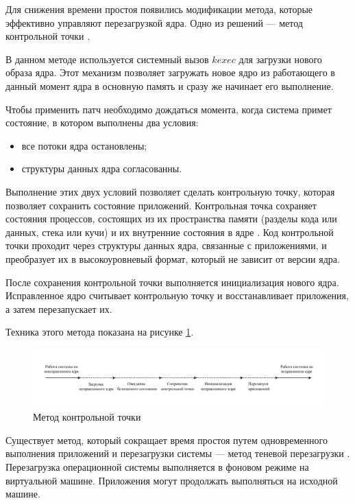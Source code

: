 Для снижения времени простоя появились модификации метода, которые эффективно управляют перезагрузкой ядра. Одно из решений --- метод контрольной точки \cite{kup}.

В данном методе используется системный вызов $kexec$  \cite{seamless} для загрузки нового образа ядра. Этот механизм позволяет загружать новое ядро из работающего в данный момент ядра в основную память и сразу же начинает его выполнение.

Чтобы применить патч необходимо дождаться момента, когда система примет состояние, в котором выполнены два условия:
\begin{itemize}
	\item все потоки ядра остановлены;
	\item структуры данных ядра согласованны.
\end{itemize}

Выполнение этих двух условий позволяет сделать контрольную точку, которая позволяет сохранить состояние приложений. Контрольная точка сохраняет состояния процессов, состоящих из их пространства памяти (разделы кода или данных, стека или кучи)
и их внутренние состояния в ядре \cite{checkpoint}. Код контрольной точки проходит через структуры данных ядра, связанные с приложениями, и преобразует их в высокоуровневый формат, который не зависит от версии ядра. 

После сохранения контрольной точки выполняется инициализация нового ядра. Исправленное ядро считывает контрольную точку и восстанавливает приложения, а затем перезапускает их.

Техника этого метода показана на рисунке \ref{img:checkpoint}.

\begin{figure}[H]
	\begin{center}
		\includegraphics[scale=0.7]{img/checkpoint.pdf}
	\end{center}
	\captionsetup{justification=centering}
	\caption{Метод контрольной точки}
	\label{img:checkpoint}
\end{figure}

Существует метод, который сокращает время простоя путем одновременного выполнения приложений и перезагрузки системы --- метод теневой перезагрузки \cite{shadow}. Перезагрузка операционной системы выполняется в фоновом режиме на виртуальной машине. Приложения могут продолжать выполняться на исходной машине.

